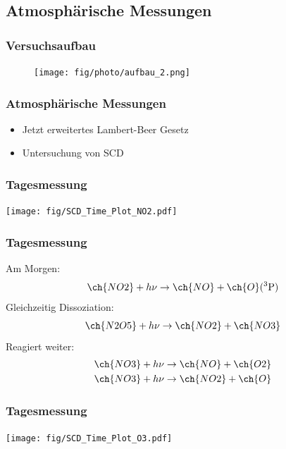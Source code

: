 \documentclass{beamer}
\begin{document}
\begin{frame}
    \section{Atmosphärische Messungen}
    \frametitle{Versuchsaufbau}
    \begin{figure}[h]
        \texttt{[image: fig/photo/aufbau\_2.png]}
    \end{figure}
\end{frame}


\begin{frame}
    \frametitle{Atmosphärische Messungen}
    \begin{itemize}
        \item Jetzt erweitertes Lambert-Beer Gesetz
        \item Untersuchung von SCD
    \end{itemize}
\end{frame}


\begin{frame}
    \frametitle{Tagesmessung }
\begin{center}
    \texttt{[image: fig/SCD\_Time\_Plot\_NO2.pdf]}
    \label{fig:delta_SCD_time_NO2}
\end{center}
\end{frame}

\begin{frame}
    \frametitle{Tagesmessung }
    Am Morgen:
    \begin{align}
        \ch{NO2} + h \nu \to \ch{NO} + \ch{O}(^3\text{P})
    \end{align}
    \pause
    Gleichzeitig Dissoziation:
    \begin{align}
        \ch{N2O5} + h \nu \to \ch{NO2} + \ch{NO3}
    \end{align}
    \pause
    Reagiert weiter:
    \begin{align}
        \ch{NO3} + h \nu \to \ch{NO} + \ch{O2}\\
        \ch{NO3} + h \nu \to \ch{NO2} + \ch{O}
    \end{align}
\end{frame}

\begin{frame}
    \frametitle{Tagesmessung }
\begin{center}
    \texttt{[image: fig/SCD\_Time\_Plot\_O3.pdf]}
    \label{fig:delta_SCD_time_O3}
\end{center}
\end{frame}
\end{document}
